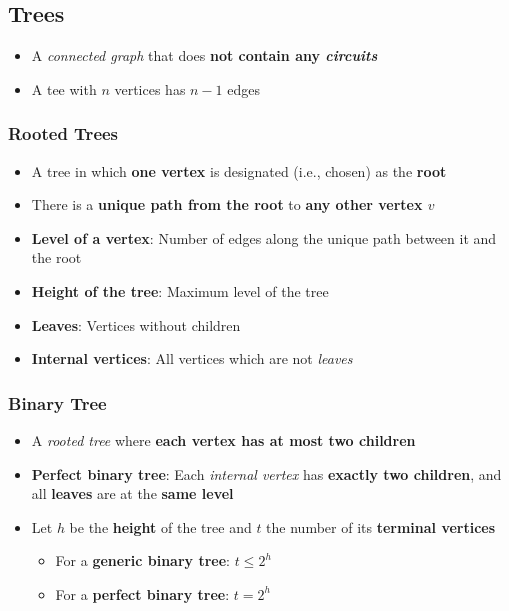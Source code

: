 \subsection{Trees}
\begin{itemize}
  \item A \textit{connected graph} that does \textbf{not contain any \textit{circuits}}
  \item A tee with $n$ vertices has $n-1$ edges 
\end{itemize}

\subsubsection{Rooted Trees}
\begin{itemize}
  \item A tree in which \textbf{one vertex} is designated (i.e., chosen) as the \textbf{root}
  \item There is a \textbf{unique path from the root} to \textbf{any other vertex $v$}
  \item \textbf{Level of a vertex}: Number of edges along the unique path between it and the root
  \item \textbf{Height of the tree}: Maximum level of the tree
  \item \textbf{Leaves}: Vertices without children
  \item \textbf{Internal vertices}: All vertices which are not \textit{leaves}
\end{itemize}

\subsubsection{Binary Tree}
\begin{itemize}
  \item A \textit{rooted tree} where \textbf{each vertex has at most two children}
  \item \textbf{Perfect binary tree}: Each \textit{internal vertex} has \textbf{exactly two children}, and all \textbf{leaves} are at the \textbf{same level}
  \item Let $h$ be the \textbf{height} of the tree and $t$ the number of its \textbf{terminal vertices}
  \begin{itemize}
    \item For a \textbf{generic binary tree}: $t \leq 2^{h}$
    \item For a \textbf{perfect binary tree}: $t = 2^{h}$
  \end{itemize}
\end{itemize}

